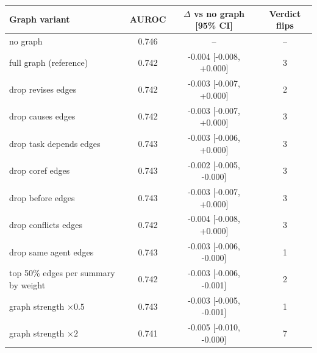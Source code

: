 \begin{tabular}{@{}lccc@{}}
\toprule
Graph variant & AUROC & $\Delta$ vs no graph [95\% CI] & Verdict flips \\
\midrule
no graph & 0.746 & -- & -- \\
full graph (reference) & 0.742 & -0.004 [-0.008, +0.000] & 3 \\
drop revises edges & 0.742 & -0.003 [-0.007, +0.000] & 2 \\
drop causes edges & 0.742 & -0.003 [-0.007, +0.000] & 3 \\
drop task depends edges & 0.743 & -0.003 [-0.006, +0.000] & 3 \\
drop coref edges & 0.743 & -0.002 [-0.005, -0.000] & 3 \\
drop before edges & 0.743 & -0.003 [-0.007, +0.000] & 3 \\
drop conflicts edges & 0.742 & -0.004 [-0.008, +0.000] & 3 \\
drop same agent edges & 0.743 & -0.003 [-0.006, -0.000] & 1 \\
top 50\% edges per summary by weight & 0.742 & -0.003 [-0.006, -0.001] & 2 \\
graph strength $\times 0.5$ & 0.743 & -0.003 [-0.005, -0.001] & 1 \\
graph strength $\times 2$ & 0.741 & -0.005 [-0.010, -0.000] & 7 \\
\bottomrule
\end{tabular}